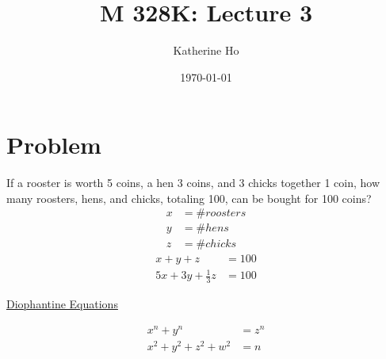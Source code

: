 \documentclass[letterpaper]{article}
\title{M 328K: Lecture 3}
\author{Katherine Ho}
\date\today
\begin{document}
\maketitle

\section{Problem}
    If a rooster is worth 5 coins, a hen 3 coins, and 3 chicks together 1 coin,
    how many roosters, hens, and chicks, totaling 100, can be bought for 100 coins?
    \begin{align*}
        x & = \# roosters \\
        y & = \# hens \\
        z & = \# chicks 
    \end{align*}
    \begin{align*}
        x+y+z & = 100 \\
        5x + 3y + \frac{1}{3}z & = 100
    \end{align*}
    \begin{center}
        \underline{Diophantine Equations}
    \end{center}
    \begin{align*}
        x^n+y^n & = z^n \\
        x^2+y^2+z^2+w^2 & = n
    \end{align*}
\end{document}

